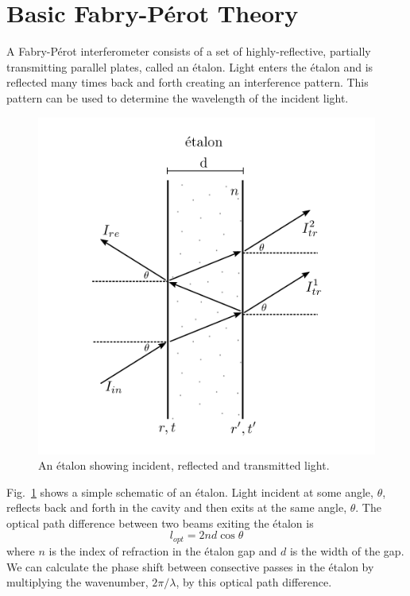 \documentclass{article}
\begin{document}
\section{Basic Fabry-P\'{e}rot Theory}
A Fabry-P\'{e}rot interferometer consists of a set of highly-reflective, partially transmitting parallel plates, called an \'{e}talon. Light enters the \'{e}talon and is reflected many times back and forth creating an interference pattern. This pattern can be used to determine the wavelength of the incident light. 
\begin{figure}
\begin{center}
\includegraphics[scale=1]{Images/etalon.png}
\caption{An \'{e}talon showing incident, reflected and transmitted light.
\label{fig:etalon}}
\end{center}
\end{figure}
Fig.~\ref{fig:etalon} shows a simple schematic of an \'{e}talon. Light incident at some angle, $\theta$, reflects back and forth in the cavity and then exits at the same angle, $\theta$. The optical path difference between two beams exiting the \'{e}talon is
\begin{equation}
l_{opt} = 2nd\cos{\theta}
\end{equation}
where $n$ is the index of refraction in the \'{e}talon gap and $d$ is the width of the gap. We can calculate the phase shift between consective passes in the \'{e}talon by multiplying the wavenumber, $2\pi/\lambda$, by this optical path difference. 
\end{document}
